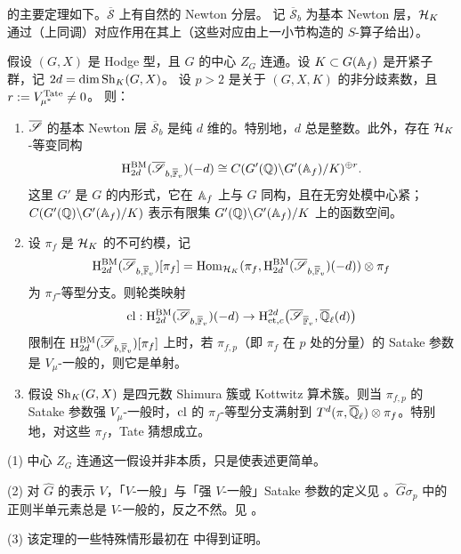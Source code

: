 \cite{XZ} 的主要定理如下。$\overline{\mathscr S}$ 上有自然的 Newton 分层。
记 $\overline{\mathscr S}_b$ 为基本 Newton 层，${\mathcal H}_K$ 通过（上同调）对应作用在其上（这些对应由上一小节构造的 $S$-算子给出）。
\begin{thm}
\label{T:main theorem}
假设 $(G,X)$ 是 Hodge 型，且 $G$ 的中心 $Z_G$ 连通。设 $K\subset G({\mathbb A}_f)$ 是开紧子群，记 $2d=\dim\operatorname{Sh}_K(G,X)$。
设 $p>2$ 是关于 $(G,X,K)$ 的非分歧素数，且 $r:=V_{\mu^*}^{\mathrm{Tate}}\neq 0$。
则：
\begin{enumerate}
\item $\overline{\mathscr{S}}$ 的基本 Newton 层 $\overline{\mathscr S}_b$ 是纯 $d$ 维的。特别地，$d$ 总是整数。此外，存在 ${\mathcal H}_K$-等变同构
$${\rm H}^{\rm BM}_{2d}(\overline{\mathscr S}_{b, \overline {\mathbb{F}}_v})(-d)\cong C(G'({\mathbb Q})\backslash G'({\mathbb A}_f)/K)^{\oplus r}.$$
这里 $G'$ 是 $G$ 的内形式，它在 ${\mathbb A}_f$ 上与 $G$ 同构，且在无穷处模中心紧；$C(G'({\mathbb Q})\backslash G'({\mathbb A}_f)/K)$ 表示有限集 $G'({\mathbb Q})\backslash G'({\mathbb A}_f)/K$ 上的函数空间。

\item
设 $\pi_f$ 是 $\mathcal{H}_K$ 的不可约模，记
$${\rm H}^{\rm BM}_{2d}(\overline{\mathscr S}_{b, \overline {\mathbb{F}}_v})[\pi_f]={\operatorname{Hom}}_{{\mathcal H}_K}(\pi_f,{\rm H}^{\rm BM}_{2d}(\overline{\mathscr S}_{b, \overline {\mathbb{F}}_v})(-d))\otimes \pi_f$$
为 $\pi_f$-等型分支。则轮类映射
\[\operatorname{cl}:{\rm H}^{\rm BM}_{2d}(\overline{\mathscr S}_{b, \overline {\mathbb{F}}_v})(-d)\to {\rm H}^{2d}_{\mathrm{et},c}\big(\overline{\mathscr S}_{\overline {\mathbb{F}}_v},\overline{{\mathbb Q}}_\ell(d)\big)\]
限制在 ${\rm H}^{\rm BM}_{2d}(\overline{\mathscr S}_{b, \overline {\mathbb{F}}_v})[\pi_f]$ 上时，若 $\pi_{f,p}$（即 $\pi_f$ 在 $p$ 处的分量）的 Satake 参数是 $V_\mu$-一般的，则它是单射。

\item 假设 $\operatorname{Sh}_K(G,X)$ 是四元数 Shimura 簇或 Kottwitz 算术簇。则当 $\pi_{f,p}$ 的 Satake 参数强 $V_\mu$-一般时，$\operatorname{cl}$ 的 $\pi_f$-等型分支满射到 $T^d(\pi,{\overline{{\mathbb Q}}_\ell})\otimes\pi_f$。特别地，对这些 $\pi_f$，Tate 猜想成立。
\end{enumerate}
\end{thm}
\begin{rmk}
(1) 中心 $Z_G$ 连通这一假设并非本质，只是使表述更简单。

(2) 对 $\hat G$ 的表示 $V$，「$V$-一般」与「强 $V$-一般」Satake 参数的定义见 \cite[定义 1.4.2]{XZ}。$\hat G\sigma_p$ 中的正则半单元素总是 $V$-一般的，反之不然。见 \cite[注 1.4.3]{XZ}。

(3) 该定理的一些特殊情形最初在 \cite{HTX,TX} 中得到证明。
\end{rmk}

